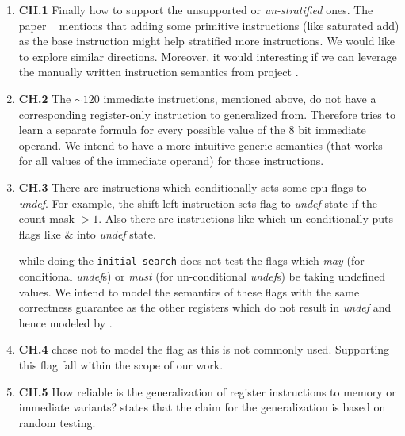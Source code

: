 \begin{enumerate}
    
    \item \textbf{CH.1} Finally how to support the unsupported or
    \emph{un-stratified} ones. The paper ~\cite{Heule2016a} mentions that adding
    some primitive instructions (like saturated add) as the base instruction
    might help stratified more instructions. We would like to explore similar
    directions. Moreover, it would interesting if we can leverage the manually
    written instruction semantics from project \Stoke.  
           
    \item \textbf{CH.2} The $\sim120$ immediate instructions, mentioned above,
    do not have a corresponding register-only instruction to generalized from.
    Therefore \Strata tries to learn a separate formula for every possible value
    of the 8 bit immediate operand.  We intend to have a more intuitive generic
    semantics (that works for all values of the immediate operand) for those
    instructions. 

 \item \textbf{CH.3} There are instructions which conditionally sets some cpu
 flags to \emph{undef}. For example, the shift left instruction  sets flag  to \emph{undef} state if the count mask $>1$.
   Also there are instructions like  which
   un-conditionally puts flags like  \&  into \emph{undef}
   state.
    
    \Strata while doing the {\tt initial search} does not test the flags which
    \emph{may} (for conditional \emph{undef}s)  or \emph{must} (for
        un-conditional \emph{undef}s) be taking undefined values. We intend to
    model the semantics of these flags with the same correctness guarantee as
    the other registers which do not result in \emph{undef} and hence modeled by
    \Strata.

    \item \textbf{CH.4} \Strata chose not to model the  flag as this is
    not commonly used. Supporting this flag fall within the scope of our work.
      
    \item \textbf{CH.5} How reliable is the generalization of register
    instructions to memory or immediate variants? \Strata states that the claim
    for the generalization is based on random testing.
    
        

\end{enumerate} 

